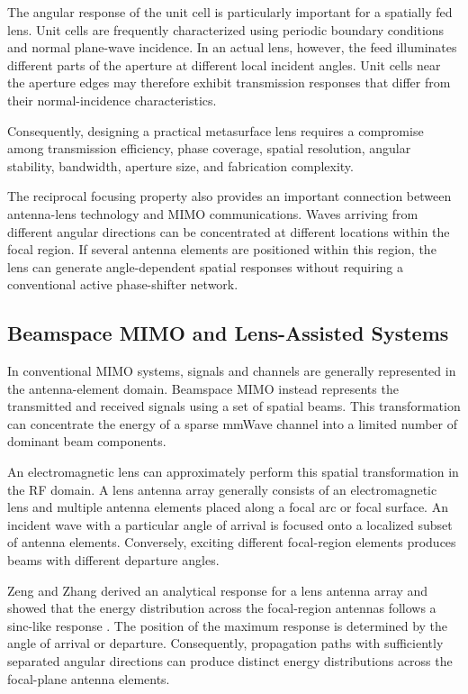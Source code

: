 The angular response of the unit cell is particularly important for a
spatially fed lens. Unit cells are frequently characterized using
periodic boundary conditions and normal plane-wave incidence. In an
actual lens, however, the feed illuminates different parts of the
aperture at different local incident angles. Unit cells near the
aperture edges may therefore exhibit transmission responses that
differ from their normal-incidence characteristics.

Consequently, designing a practical metasurface lens requires a
compromise among transmission efficiency, phase coverage, spatial
resolution, angular stability, bandwidth, aperture size, and
fabrication complexity.

The reciprocal focusing property also provides an important
connection between antenna-lens technology and MIMO communications.
Waves arriving from different angular directions can be concentrated
at different locations within the focal region. If several antenna
elements are positioned within this region, the lens can generate
angle-dependent spatial responses without requiring a conventional
active phase-shifter network.


\subsection{Beamspace MIMO and Lens-Assisted Systems}
\label{subsec:beamspace_mimo}

In conventional MIMO systems, signals and channels are generally
represented in the antenna-element domain. Beamspace MIMO instead
represents the transmitted and received signals using a set of
spatial beams. This transformation can concentrate the energy of a
sparse mmWave channel into a limited number of dominant beam
components.

An electromagnetic lens can approximately perform this spatial
transformation in the RF domain. A lens antenna array generally
consists of an electromagnetic lens and multiple antenna elements
placed along a focal arc or focal surface. An incident wave with a
particular angle of arrival is focused onto a localized subset of
antenna elements. Conversely, exciting different focal-region
elements produces beams with different departure angles.

Zeng and Zhang derived an analytical response for a lens antenna array
and showed that the energy distribution across the focal-region
antennas follows a sinc-like response
\cite{Zeng2016}. The position of the maximum response is determined
by the angle of arrival or departure. Consequently, propagation paths
with sufficiently separated angular directions can produce distinct
energy distributions across the focal-plane antenna elements.

